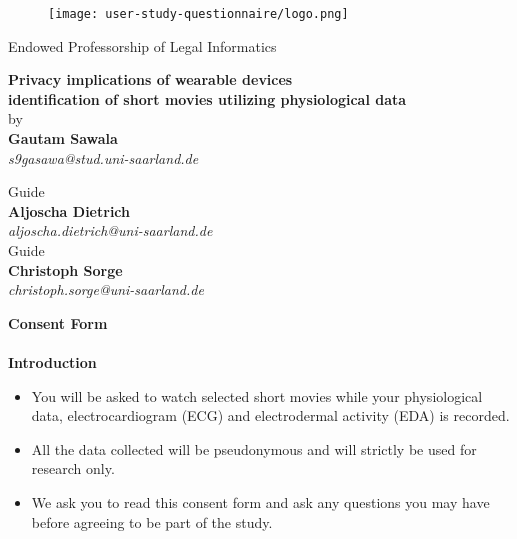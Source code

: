 \documentclass[12pt,fleqn]{scrreprt}
\begin{document}
\begin{figure}
\centering
    \texttt{[image: user-study-questionnaire/logo.png]}
\end{figure}

\begin{center}
{\LARGE Endowed Professorship of Legal Informatics}
\end{center}
\begin{center}
{\large \bf Privacy implications of wearable devices \\ identification of short movies utilizing physiological data} \\
by \\
\RaggedLeft
{ \bf Gautam Sawala } \\
\textit{s9gasawa@stud.uni-saarland.de} \\
\end{center}
\begin{multicols}{2}
\begin{center}
Guide \\
{ \bf Aljoscha Dietrich} \\
\textit{aljoscha.dietrich@uni-saarland.de } \\
Guide \\
{ \bf Christoph Sorge} \\
\textit{christoph.sorge@uni-saarland.de} \\
\end{center}
\end{multicols}
\vspace{4mm}
\begin{center}
{\Huge \bf Consent Form}
\end{center}

\paragraph{}
{\large \bf Introduction}
\begin{itemize}
  \item You will be asked to watch selected short movies while your physiological data, electrocardiogram (ECG) and electrodermal activity (EDA) is recorded.
  \item All the data collected will be pseudonymous and will strictly be used for research only.
  \item We ask you to read this consent form and ask any questions you may have before agreeing to be part of the study.
\end{itemize}
\end{document}

